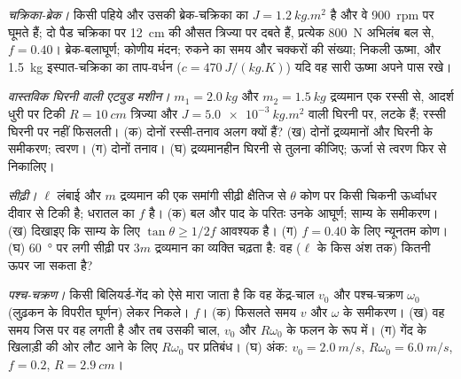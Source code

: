\begin{exercise}[$\star\star$]\label{exo:b2:rigid-body-mechanics:6}
\emph{चक्रिका-ब्रेक।} किसी पहिये और उसकी ब्रेक-चक्रिका का $J = \qty{1.2}{kg.m^2}$
है और वे \qty{900}{rpm} पर घूमते हैं; दो पैड चक्रिका पर \qty{12}{cm} की
औसत त्रिज्या पर दबते हैं, प्रत्येक \qty{800}{N} अभिलंब बल से, $f = 0.40$।
ब्रेक-बलाघूर्ण; कोणीय मंदन; रुकने का समय और चक्करों की संख्या;
निकली ऊष्मा, और \qty{1.5}{kg} इस्पात-चक्रिका का ताप-वर्धन
($c = \qty{470}{J/(kg.K)}$) यदि वह सारी ऊष्मा अपने पास रखे।
\end{exercise}

\begin{exercise}[$\star\star$]\label{exo:b2:rigid-body-mechanics:7}
\emph{वास्तविक घिरनी वाली एटवुड मशीन।} $m_1 = \qty{2.0}{kg}$
और $m_2 = \qty{1.5}{kg}$ द्रव्यमान एक रस्सी से, आदर्श धुरी पर टिकी $R =
\qty{10}{cm}$ त्रिज्या और $J = \qty{5.0e-3}{kg.m^2}$  वाली
घिरनी पर, लटके हैं; रस्सी घिरनी पर नहीं फिसलती। (क) दोनों
रस्सी-तनाव अलग क्यों हैं? (ख) दोनों द्रव्यमानों और घिरनी के
समीकरण; त्वरण। (ग) दोनों तनाव। (घ) द्रव्यमानहीन घिरनी से तुलना
कीजिए; ऊर्जा से त्वरण फिर से निकालिए।
\end{exercise}

\begin{exercise}[$\star\star$]\label{exo:b2:rigid-body-mechanics:8}
\emph{सीढ़ी।} $\ell$ लंबाई और $m$ द्रव्यमान की एक समांगी सीढ़ी क्षैतिज से
$\theta$ कोण पर किसी चिकनी ऊर्ध्वाधर दीवार से टिकी है;
धरातल का  $f$ है। (क) बल और पाद के परितः उनके आघूर्ण;
साम्य के समीकरण। (ख) दिखाइए कि साम्य के लिए
$\tan\theta \ge 1/2f$ आवश्यक है। (ग) $f = 0.40$ के लिए न्यूनतम कोण। (घ)
\qty{60}{\degree} पर लगी सीढ़ी पर $3m$ द्रव्यमान का व्यक्ति चढ़ता है: वह
($\ell$ के किस अंश तक) कितनी ऊपर जा सकता है?
\end{exercise}

\begin{exercise}[$\star\star$]\label{exo:b2:rigid-body-mechanics:9}
\emph{पश्च-चक्रण।} किसी बिलियर्ड-गेंद को ऐसे मारा जाता है कि वह
केंद्र-चाल $v_0$ और पश्च-चक्रण $\omega_0$ (लुढ़कन के विपरीत घूर्णन) लेकर
निकले।  $f$। (क) फिसलते समय $v$ और $\omega$ के
समीकरण। (ख) वह समय जिस पर वह  लगती है और तब
उसकी चाल, $v_0$ और $R\omega_0$ के फलन के रूप में। (ग) गेंद के खिलाड़ी की
ओर लौट आने के लिए $R\omega_0$ पर प्रतिबंध। (घ) अंक:
$v_0 = \qty{2.0}{m/s}$, $R\omega_0 = \qty{6.0}{m/s}$, $f = 0.2$,
$R = \qty{2.9}{cm}$।
\end{exercise}

